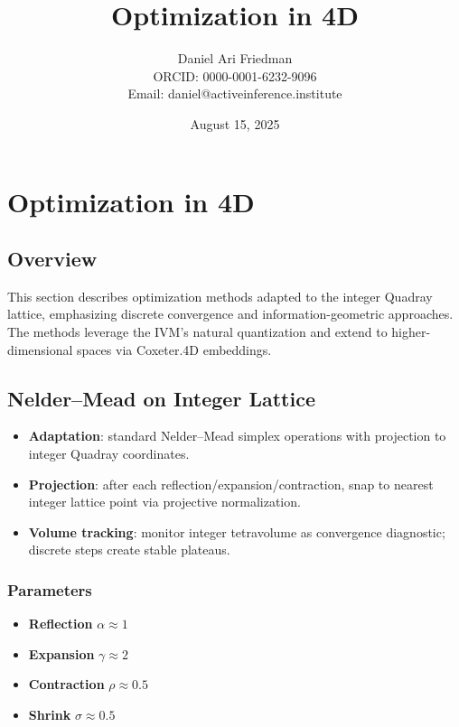 \documentclass[
  10pt,
]{article}
\title{Optimization in 4D}
\author{Daniel Ari Friedman\\ ORCID: 0000-0001-6232-9096\\ Email: daniel@activeinference.institute}
\date{August 15, 2025}
\providecommand{\tightlist}{%
  \setlength{\itemsep}{0pt}\setlength{\parskip}{0pt}}
\begin{document}
\maketitle

{
\hypersetup{linkcolor=black}
\setcounter{tocdepth}{3}
\tableofcontents
}
\hypertarget{optimization-in-4d}{%
\section{Optimization in 4D}\label{optimization-in-4d}}

\hypertarget{overview}{%
\subsection{Overview}\label{overview}}

This section describes optimization methods adapted to the integer
Quadray lattice, emphasizing discrete convergence and
information-geometric approaches. The methods leverage the IVM's natural
quantization and extend to higher-dimensional spaces via Coxeter.4D
embeddings.

\hypertarget{neldermead-on-integer-lattice}{%
\subsection{Nelder--Mead on Integer
Lattice}\label{neldermead-on-integer-lattice}}

\begin{itemize}
\tightlist
\item
  \textbf{Adaptation}: standard Nelder--Mead simplex operations with
  projection to integer Quadray coordinates.
\item
  \textbf{Projection}: after each reflection/expansion/contraction, snap
  to nearest integer lattice point via projective normalization.
\item
  \textbf{Volume tracking}: monitor integer tetravolume as convergence
  diagnostic; discrete steps create stable plateaus.
\end{itemize}

\hypertarget{parameters}{%
\subsubsection{Parameters}\label{parameters}}

\begin{itemize}
\tightlist
\item
  \textbf{Reflection} \(\alpha \approx 1\)
\item
  \textbf{Expansion} \(\gamma \approx 2\)
\item
  \textbf{Contraction} \(\rho \approx 0.5\)
\item
  \textbf{Shrink} \(\sigma \approx 0.5\)
\end{itemize}
\end{document}
